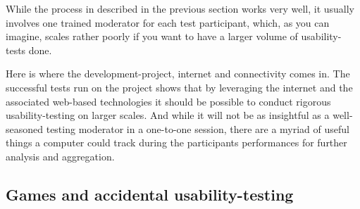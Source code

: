 \documentclass{article}
\begin{document}
\begin{multicols*}{2}[]
    While the process in described in the previous section works very well, it
    usually involves one trained moderator for each test participant, which, as
    you can imagine, scales rather poorly if you want to have a larger volume
    of usability-tests done.

    Here is where the development-project, internet and connectivity comes in.
    The successful tests run on the project shows that by leveraging the
    internet and the associated web-based technologies it should be possible to
    conduct rigorous usability-testing on larger scales. And while it will not
    be as insightful as a well-seasoned testing moderator in a one-to-one
    session, there are a myriad of useful things a computer could track
    during the participants performances for further analysis and aggregation.

  \subsection*{Games and accidental usability-testing}

  \end{multicols*}
\end{document}
